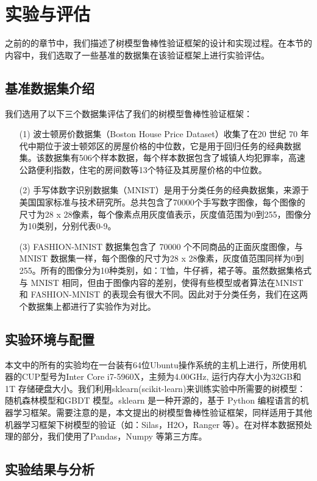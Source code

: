 \chapter{实验与评估}
\label{ch5}
之前的的章节中，我们描述了树模型鲁棒性验证框架的设计和实现过程。在本节的内容中，我们选取了一些基准的数据集在该验证框架上进行实验评估。
\section{基准数据集介绍}
我们选用了以下三个数据集评估了我们的树模型鲁棒性验证框架：
\begin{enumerate}
	\item [(1)] 波士顿房价数据集（Boston House Price Dataset）收集了在20 世纪 70 年代中期位于波士顿郊区的房屋价格的中位数，它是用于回归任务的经典数据集。该数据集有506个样本数据，每个样本数据包含了城镇人均犯罪率，高速公路便利指数，住宅的房间数等13个特征及其房屋价格的中位数。
	\item [(2)] 手写体数字识别数据集（MNIST）是用于分类任务的经典数据集，来源于美国国家标准与技术研究所。总共包含了70000个手写数字图像，每个图像的尺寸为28 x 28像素，每个像素点用灰度值表示，灰度值范围为0到255，图像分为10类别，分别代表0-9。
	\item [(3)] FASHION-MNIST 数据集包含了 70000 个不同商品的正面灰度图像，与 MNIST 数据集一样，每个图像的尺寸为28 x 28像素，灰度值范围同样为0到255。所有的图像分为10种类别，如：T恤，牛仔裤，裙子等。虽然数据集格式与 MNIST 相同，但由于图像内容的差别，使得有些模型或者算法在MNIST 和 FASHION-MNIST 的表现会有很大不同。因此对于分类任务，我们在这两个数据集上都进行了实验作为对比。
\end{enumerate}

\section{实验环境与配置}
本文中的所有的实验均在一台装有64位Ubuntu操作系统的主机上进行，所使用机器的CUP型号为Inter Core i7-5960X，主频为4.00GHz, 运行内存大小为32GB和 1T 存储硬盘大小。我们利用sklearn(scikit-learn)来训练实验中所需要的树模型：随机森林模型和GBDT 模型。sklearn 是一种开源的，基于 Python 编程语言的机器学习框架。需要注意的是，本文提出的树模型鲁棒性验证框架，同样适用于其他机器学习框架下树模型的验证（如：Silas\cite{bride2019silas}，H2O，Ranger\cite{wright2015ranger} 等）。在对样本数据预处理的部分，我们使用了Pandas，Numpy 等第三方库。

\section{实验结果与分析}

